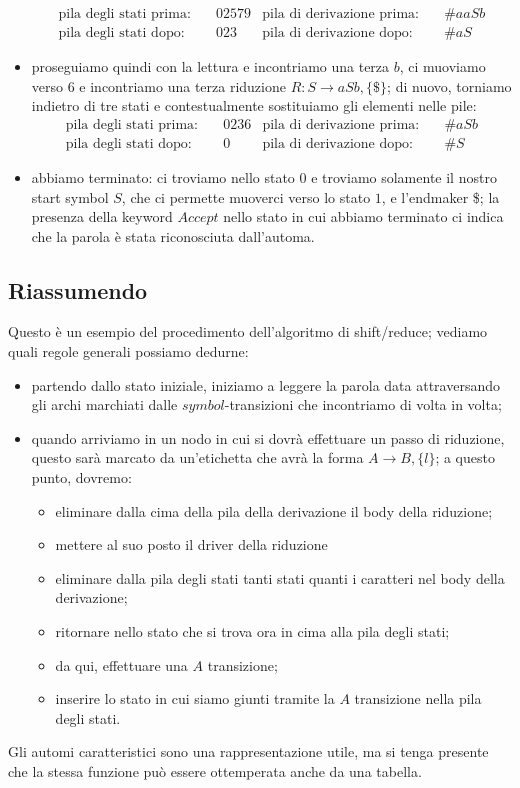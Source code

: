 \documentclass[class=book, crop=false, oneside, 12pt]{standalone}
\begin{document}
\begin{itemize}
    \begin{align*}
        \textrm{pila degli stati prima:} &\quad 02579 & \textrm{pila di derivazione prima:} &\quad \#aaSb \\
        \textrm{pila degli stati dopo:} &\quad 023 & \textrm{pila di derivazione dopo:} &\quad \#aS
    \end{align*}
    \item proseguiamo quindi con la lettura e incontriamo una terza \(b\), ci muoviamo verso \(6\) e incontriamo una terza riduzione \(R: S \to aSb, \{\$\}\); di nuovo, torniamo indietro di tre stati e contestualmente sostituiamo gli elementi nelle pile: 
    \begin{align*}
        \textrm{pila degli stati prima:} &\quad 0236 & \textrm{pila di derivazione prima:} &\quad \#aSb \\
        \textrm{pila degli stati dopo:} &\quad 0 & \textrm{pila di derivazione dopo:} &\quad \#S
    \end{align*}
    \item abbiamo terminato: ci troviamo nello stato \(0\) e troviamo solamente il nostro start symbol \(S\), che ci permette  muoverci verso lo stato \(1\), e l'endmaker \$; la presenza della keyword \(Accept\) nello stato in cui abbiamo terminato ci indica che la parola è stata riconosciuta dall'automa.
\end{itemize}

\subsection{Riassumendo}
Questo è un esempio del procedimento dell'algoritmo di shift/reduce; vediamo quali regole generali possiamo dedurne:
\begin{itemize}
    \item partendo dallo stato iniziale, iniziamo a leggere la parola data attraversando gli archi marchiati dalle \(symbol\)-transizioni che incontriamo di volta in volta;
    \item quando arriviamo in un nodo in cui si dovrà effettuare un passo di riduzione, questo sarà marcato da un'etichetta che avrà la forma \(A \to B, \{l\}\); a questo punto, dovremo:
    \begin{itemize}
        \item eliminare dalla cima della pila della derivazione il body della riduzione;
        \item mettere al suo posto il driver della riduzione
        \item eliminare dalla pila degli stati tanti stati quanti i caratteri nel body della derivazione;
        \item ritornare nello stato che si trova ora in cima alla pila degli stati;
        \item da qui, effettuare una \(A\) transizione;
        \item inserire lo stato in cui siamo giunti tramite la \(A\) transizione nella pila degli stati. 
    \end{itemize}
\end{itemize}
Gli automi caratteristici sono una rappresentazione utile, ma si tenga presente che la stessa funzione può essere ottemperata anche da una tabella.
\end{document}
